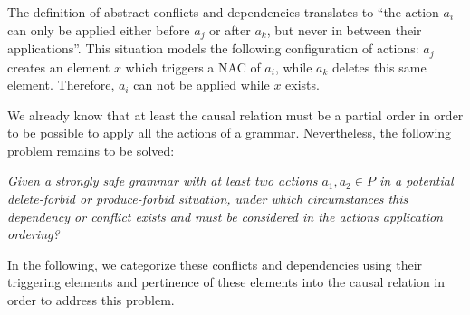The definition of abstract conflicts and dependencies translates to ``the action $a_i$ can only be applied either before $a_j$ or after $a_k$, but never in between their applications''. This situation models the following configuration of actions: $a_j$ creates an element $x$ which triggers a NAC of $a_i$, while $a_k$ deletes this same element. Therefore, $a_i$ can not be applied while $x$ exists.

We already know that at least the causal relation must be a partial order in order to be possible to apply all the actions of a grammar. Nevertheless, the following problem remains to be solved:

\begin{intuition}
  \emph{Given a strongly safe grammar \doublyTypedGraphGrammarCore{} with at least two actions $a_1, a_2 \in P$ in a potential delete-forbid or produce-forbid situation, under which circumstances this dependency or conflict exists and must be considered in the actions application ordering?}
\end{intuition}

In the following, we categorize these conflicts and dependencies using their triggering elements and pertinence of these elements into the causal relation in order to address this problem.

